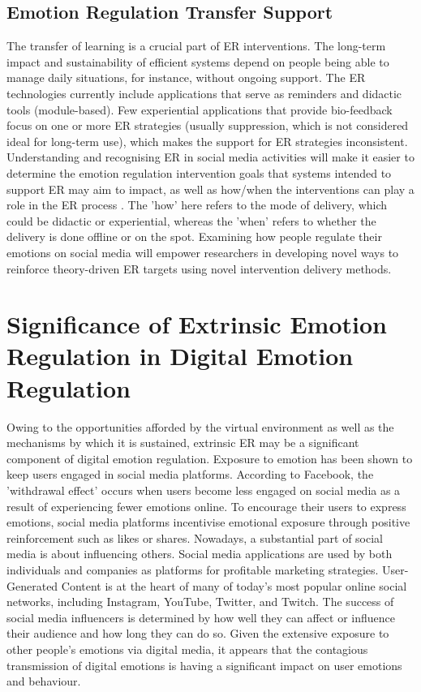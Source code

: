 \documentclass[lettersize,journal]{IEEEtran}
\begin{document}
\subsection{Emotion Regulation Transfer Support}
The transfer of learning is a crucial part of ER interventions. The long-term impact and sustainability of efficient systems depend on people being able to manage daily situations, for instance, without ongoing support. The ER technologies currently include applications that serve as reminders and didactic tools (module-based). Few experiential applications that provide bio-feedback focus on one or more ER strategies (usually suppression, which is not considered ideal for long-term use), which makes the support for ER strategies inconsistent. Understanding and recognising ER in social media activities will make it easier to determine the emotion regulation intervention goals that systems intended to support ER may aim to impact, as well as how/when the interventions can play a role in the ER process \cite{slovak2022designing}. The 'how' here refers to the mode of delivery, which could be didactic or experiential, whereas the 'when' refers to whether the delivery is done offline or on the spot. Examining how people regulate their emotions on social media will empower researchers in developing novel ways to reinforce theory-driven ER targets using novel intervention delivery methods.

\section{Significance of Extrinsic Emotion Regulation in Digital Emotion Regulation}
Owing to the opportunities afforded by the virtual environment as well as the mechanisms by which it is sustained, extrinsic ER may be a significant component of digital emotion regulation. Exposure to emotion has been shown to keep users engaged in social media platforms. According to Facebook, the 'withdrawal effect' occurs when users become less engaged on social media as a result of experiencing fewer emotions online. To encourage their users to express emotions, social media platforms incentivise emotional exposure through positive reinforcement such as likes or shares. Nowadays, a substantial part of social media is about influencing others. Social media applications are used by both individuals and companies as platforms for profitable marketing strategies. User-Generated Content is at the heart of many of today's most popular online social networks, including Instagram, YouTube, Twitter, and Twitch. The success of social media influencers is determined by how well they can affect or influence their audience and how long they can do so. Given the extensive exposure to other people's emotions via digital media, it appears that the contagious transmission of digital emotions is having a significant impact on user emotions and behaviour.
\end{document}
